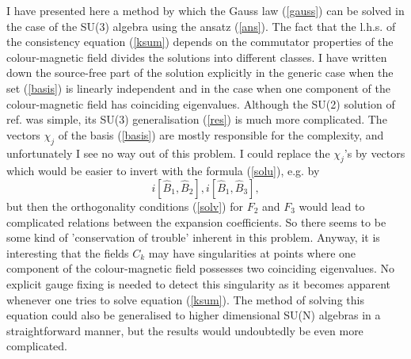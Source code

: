 \documentclass[a4paper,12pt]{article}
\begin{document}
I have presented here a method by which the Gauss law (\ref{gauss}) can be solved in the case of the SU(3) algebra using the ansatz (\ref{ans}). The fact that the l.h.s. of the consistency equation (\ref{ksum}) depends on the commutator properties of the colour-magnetic field divides the solutions into different classes. I have written down the source-free part of the solution explicitly in the generic case when the set (\ref{basis}) is linearly independent and in the case when one component of the colour-magnetic field has coinciding eigenvalues. Although the SU(2) solution of ref. \cite{ms1} was simple, its SU(3) generalisation (\ref{res}) is much more complicated. The vectors $\chi_j$ of the basis (\ref{basis}) are mostly responsible for the complexity, and unfortunately I see no way out of this problem. I could replace the $\chi_j$'s by vectors which would be easier to invert with the formula (\ref{solu}),  e.g. by
$$ i[\widehat{B}_1,\widehat{B}_2], i[\widehat{B}_1,\widehat{B}_3], $$
but then the orthogonality conditions (\ref{solv}) for $F_2$ and $F_3$ would lead to complicated relations between the expansion coefficients. So there seems to be some kind of 'conservation of trouble' inherent in this problem. Anyway, it is interesting that the fields $C_k$ may have singularities at points where one component of the colour-magnetic field possesses two coinciding eigenvalues. No explicit gauge fixing is needed to detect this singularity as it becomes apparent whenever one tries to solve equation (\ref{ksum}). The method of solving this equation could also be generalised to higher dimensional SU(N) algebras in a straightforward manner, but the results would undoubtedly be even more complicated.

\appendix
\end{document}
